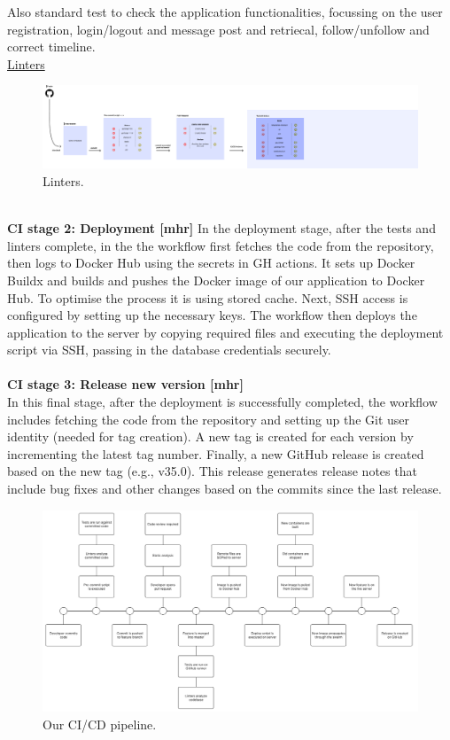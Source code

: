 \documentclass{article}
\begin{document}
Also standard test to check the application functionalities, focussing on the user
registration, login/logout and message post and retriecal, follow/unfollow and
correct timeline.
\\
\noindent \underline{Linters}
\\
\begin{figure}[ht]
    \centering
    \includegraphics[width=1.0\textwidth]{./pdfs/linter.pdf} 
    \caption{Linters.}
    \label{fig:Linter}
\end{figure}
\\
\textbf{CI stage 2: Deployment [mhr]}
In the deployment stage, after the tests and linters complete, in the the workflow
first fetches the code from the repository, then logs to Docker Hub using the
secrets in GH actions. It sets up Docker Buildx and builds and pushes the
Docker image of our application to Docker Hub. To optimise the process it is
using stored cache.
Next, SSH access is configured by setting up the necessary keys. The workflow
then deploys the application to the server by copying required files and
executing the deployment script via SSH, passing in the database credentials
securely.
\\\\
\textbf{CI stage 3: Release new version [mhr]}\\
In this final stage, after the deployment is successfully completed, the workflow
includes fetching the code from the repository and setting up the Git user
identity (needed for tag creation). A new tag is created for each version by
incrementing the latest tag number. Finally, a new GitHub release is created
based on the new tag (e.g., v35.0). This release generates release notes that
include bug fixes and other changes based on the commits since the last release.

\begin{figure}[ht]
    \centering
    \includegraphics[width=1.0\textwidth]{./images/CICD_pipeline.png} 
    \caption{Our CI/CD pipeline.}
    \label{fig:Our commit to deploy pipeline.}
\end{figure}
\end{document}
